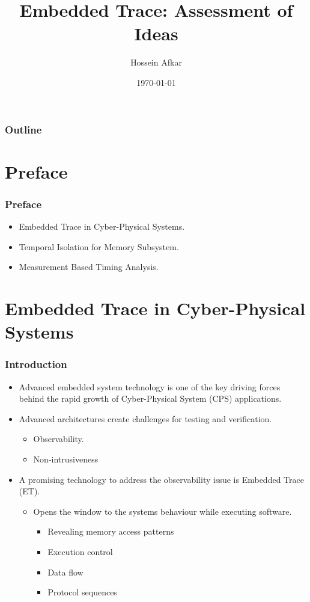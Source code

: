\documentclass{beamer}
\title[Embedded Trace]
{Embedded Trace: Assessment of Ideas}
\author[]{Hossein Afkar}
\institute{DRTS Lab}
\date{\today}
\begin{document}
\frame{\titlepage}

\begin{frame}
    \frametitle{Outline}
    \tableofcontents[hideallsubsections]
\end{frame}


\section{Preface}
\begin{frame}
    \frametitle{Preface}
    \begin{itemize}
        \item Embedded Trace in Cyber-Physical Systems.
        \item Temporal Isolation for Memory Subsystem.
        \item Measurement Based Timing Analysis.
    \end{itemize}
\end{frame}

\section{Embedded Trace in Cyber-Physical Systems}
\begin{frame}
    \frametitle{Introduction}
    \begin{itemize}
        \item Advanced embedded system technology is one of the key
            driving forces behind the rapid growth
            of Cyber-Physical System (CPS) applications.
        \item Advanced architectures create challenges for testing and
            verification.
            \begin{itemize}
                \item Observability.
                \item Non-intrusiveness
            \end{itemize}
        \item A promising technology to address the observability issue is
            Embedded Trace (ET).
            \begin{itemize}
                \item Opens the window to the systems behaviour while
                    executing software.
                    \begin{itemize}
                        \item Revealing memory access patterns
                        \item Execution control
                        \item Data flow
                        \item Protocol sequences
                    \end{itemize}
            \end{itemize}
    \end{itemize}
\end{frame}
\end{document}
